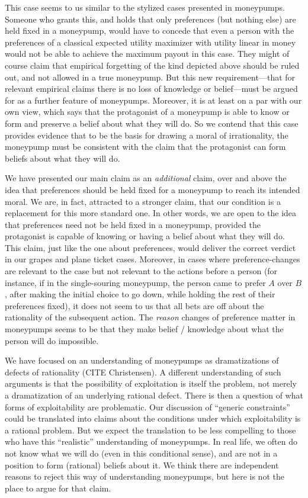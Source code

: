 \documentclass[11pt]{article}
\theoremstyle{definition}
\theoremstyle{definition}
\begin{document}

This case seems to us similar to the stylized cases presented in moneypumps. Someone who grants this, and holds that only preferences (but nothing else) are held fixed in a moneypump, would have to concede that even a person with the preferences of a classical expected utility maximizer with utility linear in money would not be able to achieve the maximum payout in this case. They might of course claim that empirical forgetting of the kind depicted above should be ruled out, and not allowed in a true moneypump. But this new requirement---that for relevant empirical claims there is no loss of knowledge or belief---must be argued for as a further feature of moneypumps. Moreover, it is at least on a par with our own view, which says that the protagonist of a moneypump is able to know or form and preserve a belief about what  they will do. So we contend that this case provides evidence that to be the basis for drawing a moral of irrationality, the moneypump must be consistent with the claim that the protagonist can form beliefs about what they will do.

We have presented our main claim as an \emph{additional} claim, over and above the idea that preferences should be held fixed for a moneypump to reach its intended moral. We are, in fact, attracted to a stronger claim, that our condition is a replacement for this more standard one. In other words, we are open to the idea that preferences need not be held fixed in a moneypump, provided the protagonist is capable of knowing or having a belief about what they will do. This claim, just like the one about preferences, would deliver the correct verdict in our grapes and plane ticket cases. Moreover, in cases where preference-changes are relevant to the case but not relevant to the actions before a person (for instance, if in the single-souring moneypump, the person came to prefer $A$ over $B$, after making the initial choice to go down, while holding the rest of their preferences fixed), it does not seem to us that all bets are off about the rationality of the subsequent action. The \emph{reason} changes of preference matter in moneypumps seems to be that they make belief / knowledge about what the person will do impossible.

We have focused on an understanding of moneypumps as dramatizations of defects of rationality (CITE Christensen). A different understanding of such arguments is that the possibility of exploitation is itself the problem, not merely a dramatization of an underlying rational defect. There is then a question of what forms of exploitability are problematic. Our discussion of ``generic constraints'' could be translated into claims about the conditions under which exploitability is a rational problem. But we expect the translation to be less compelling to those who have this ``realistic'' understanding of moneypumps. In real life, we often do not know what we will do (even in this conditional sense), and are not in a position to form (rational) beliefs about it. We think there are independent reasons to reject this way of understanding moneypumps, but here is not the place to argue for that claim.
\end{document}
